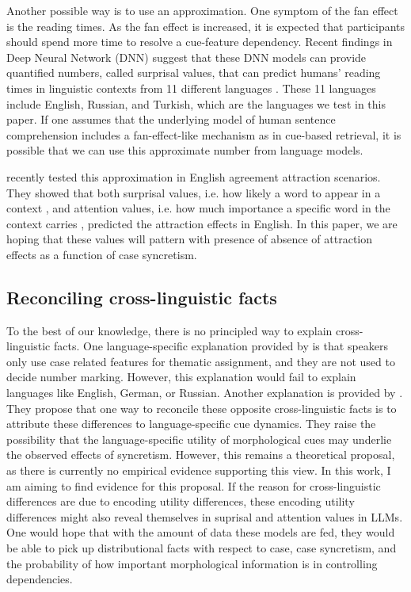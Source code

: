 \documentclass[10pt,letterpaper]{article}
\begin{document}
Another possible way is to use an approximation. One symptom of the fan effect is the reading times. As the fan effect is increased, it is expected that participants should spend more time to resolve a cue-feature dependency. Recent findings in Deep Neural Network (DNN) suggest that these DNN models can provide quantified numbers, called surprisal values, that can predict humans' reading times in linguistic contexts from 11 different languages \cite{WilcoxEtAl2023}. These 11 languages include English, Russian, and Turkish, which are the languages we test in this paper. If one assumes that the underlying model of human sentence comprehension includes a fan-effect-like mechanism as in cue-based retrieval, it is possible that we can use this approximate number from language models. 


 recently tested this approximation in English agreement attraction scenarios. They showed that both surprisal values, i.e. how likely a word to appear in a context \cite{Levy2008}, and attention values, i.e. how much importance a specific word in the context carries \cite{ClarkEtAl2019}, predicted the attraction effects in English. In this paper, we are hoping that these values will pattern with presence of absence of attraction effects as a function of case syncretism.



\subsection{Reconciling cross-linguistic facts}

To the best of our knowledge, there is no principled way to explain cross-linguistic facts. One language-specific explanation provided by  is that speakers only use case related features for thematic assignment, and they are not used to decide number marking. However, this explanation would fail to explain languages like English, German, or Russian. Another explanation is provided by . They propose that one way to reconcile these opposite cross-linguistic facts is to attribute these differences to language-specific cue dynamics. They raise the possibility that the language-specific utility of morphological cues may underlie the observed effects of syncretism. However, this remains a theoretical proposal, as there is currently no empirical evidence supporting this view. In this work, I am aiming to find evidence for this proposal. If the reason for cross-linguistic differences are due to encoding utility differences, these encoding utility differences might also reveal themselves in suprisal and attention values in LLMs. One would hope that with the amount of data these models are fed, they would be able to pick up distributional facts with respect to case, case syncretism, and the probability of how important morphological information is in controlling dependencies. 
\end{document}
